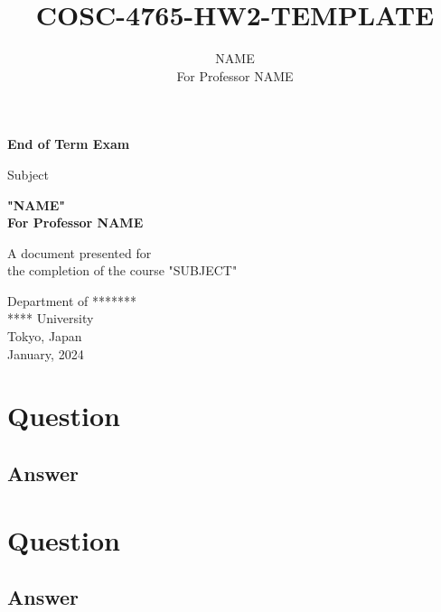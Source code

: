 \documentclass[letter]{article}
\title{COSC-4765-HW2-TEMPLATE}
\author{NAME \\ For Professor NAME}
\begin{document}
\begin{titlepage}
   \begin{center}
       \vspace*{1cm}

       \textbf{End of Term Exam}

       \vspace{0.5cm}
        Subject
            
       \vspace{1.5cm}

       \textbf{"NAME"  \\For Professor NAME}
       \vfill
            
       A document presented for\\
       the completion of the course "SUBJECT"
            
       \vspace{0.8cm}
     
            
       Department of *******\\
       **** University\\
       Tokyo, Japan\\
       January, 2024
            
   \end{center}
\end{titlepage}

\section{Question}

\subsection{Answer}

\section{Question}

\subsection{Answer}
\end{document}
